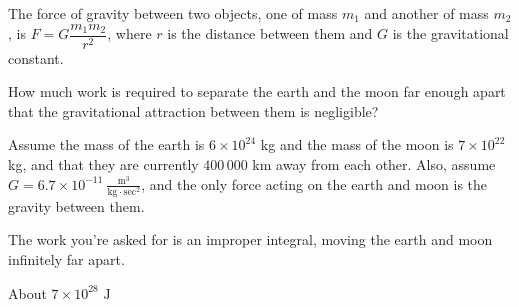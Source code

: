 \begin{question}
The force of gravity between two objects, one of mass $m_1$ and another of mass $m_2$, is $F = G\dfrac{m_1m_2}{r^2}$, where $r$ is the distance between them and $G$ is the gravitational constant.

How much work is required to separate the earth and the moon far enough apart that the gravitational attraction between them is negligible?

Assume the mass of the earth is $6 \times 10^{24}$ kg
and the mass of the moon is $7 \times 10^{22}$ kg, and that they are currently  $400\,000$ km
away from each other. Also, assume $G = 6.7\times 10^{-11} \ \frac{\text{m}^3}{\text{kg}\cdot\text{sec}^2}$, and  the only force acting on the earth and moon is the gravity between them.
\end{question}
\begin{hint}
The work you're asked for is an improper integral, moving the earth and moon infinitely far apart.
\end{hint}
\begin{answer}
About $7 \times 10^{28} \text{ J}$
\end{answer}
